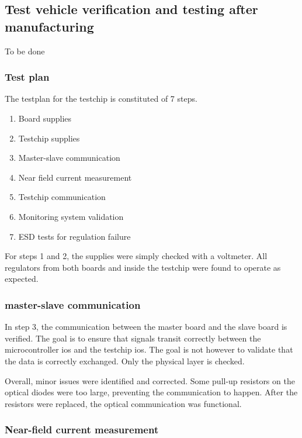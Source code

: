 \subsection{Test vehicle verification and testing after manufacturing}
\label{sec:test-vehicle-testing}

To be done

\subsubsection{Test plan}

The testplan for the testchip is constituted of 7 steps.

\begin{enumerate}
\item Board supplies
\item Testchip supplies
\item Master-slave communication
\item Near field current measurement
\item Testchip communication
\item Monitoring system validation
\item ESD tests for regulation failure
\end{enumerate}

For steps 1 and 2, the supplies were simply checked with a voltmeter.
All regulators from both boards and inside the testchip were found to operate as expected.

\subsubsection{master-slave communication}

In step 3, the communication between the master board and the slave board is verified.
The goal is to ensure that signals transit correctly between the microcontroller \gls{io}s and the testchip \gls{io}s.
The goal is not however to validate that the data is correctly exchanged.
Only the physical layer is checked.

Overall, minor issues were identified and corrected.
Some pull-up resistors on the optical diodes were too large, preventing the communication to happen.
After the resistors were replaced, the optical communication was functional.

\subsubsection{Near-field current measurement}

